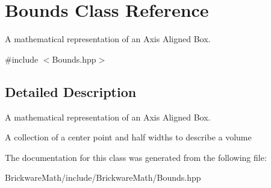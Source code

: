 \hypertarget{classBounds}{}\section{Bounds Class Reference}
\label{classBounds}


A mathematical representation of an Axis Aligned Box.  




{\ttfamily \#include $<$Bounds.\+hpp$>$}



\subsection{Detailed Description}
A mathematical representation of an Axis Aligned Box. 

A collection of a center point and half widths to describe a volume 

The documentation for this class was generated from the following file\+:\begin{DoxyCompactItemize}
\item 
Brickware\+Math/include/\+Brickware\+Math/Bounds.\+hpp\end{DoxyCompactItemize}
